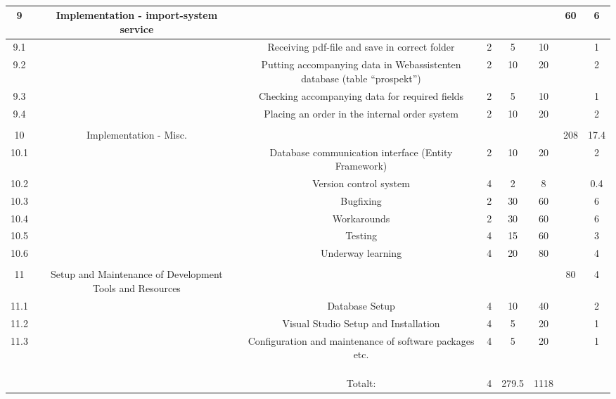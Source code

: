 \begin{table}
\begin{tabular}{|c|c|c|c|c|c|c|c|}
\hline
9 & Implementation - import-system service &  &  &  &  & 60 & 6\\ 
\hline
9.1 &  & Receiving pdf-file and save in correct folder & 2 & 5 & 10 &  & 1\\ 
\hline
9.2 &  & Putting accompanying data in Webassistenten database (table “prospekt”) & 2 & 10 & 20 &  & 2\\ 
\hline
9.3 &  & Checking accompanying data for required fields & 2 & 5 & 10 &  & 1\\ 
\hline
9.4 &  & Placing an order in the internal order system & 2 & 10 & 20 &  & 2\\ 
\hline
 &  &  &  &  &  &  & \\ 
\hline
10 & Implementation - Misc. &  &  &  &  & 208 & 17.4\\ 
\hline
10.1 &  & Database communication interface (Entity Framework) & 2 & 10 & 20 &  & 2\\ 
\hline
10.2 &  & Version control system & 4 & 2 & 8 &  & 0.4\\ 
\hline
10.3 &  & Bugfixing & 2 & 30 & 60 &  & 6\\ 
\hline
10.4 &  & Workarounds & 2 & 30 & 60 &  & 6\\ 
\hline
10.5 &  & Testing & 4 & 15 & 60 &  & 3\\ 
\hline
10.6 &  & Underway learning & 4 & 20 & 80 &  & 4\\ 
\hline
 &  &  &  &  &  &  & \\ 
\hline
11 & Setup and Maintenance of Development Tools and Resources &  &  &  &  & 80 & 4\\ 
\hline
11.1 &  & Database Setup & 4 & 10 & 40 &  & 2\\ 
\hline
11.2 &  & Visual Studio Setup and Installation & 4 & 5 & 20 &  & 1\\ 
\hline
11.3 &  & Configuration and maintenance of software packages etc. & 4 & 5 & 20 &  & 1\\ 
\hline
 &  &  &  &  &  &  & \\ 
\hline
 &  &  &  &  &  &  & \\ 
\hline
 &  &  &  &  &  &  & \\ 
\hline
 &  & Totalt: & 4 & 279.5 & 1118 &  & \\ 
\hline
\hline\end{tabular}
\label{table:table}
\caption{\small{}} 
\end{table}
